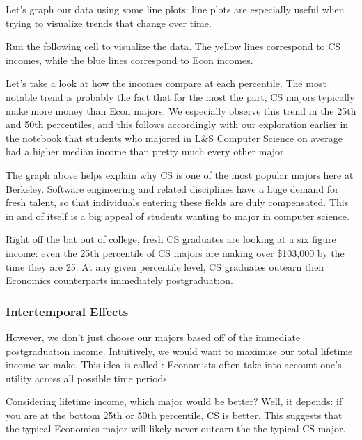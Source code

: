 \documentclass[letterpaper,10pt,english]{jupyterBook}
\begin{document}
\sphinxAtStartPar
Let’s graph our data using some line plots: line plots are especially useful when trying to visualize trends that change over time.

\sphinxAtStartPar
Run the following cell to visualize the data. The yellow lines correspond to CS incomes, while the blue lines correspond to Econ incomes.

\noindent{}

\sphinxAtStartPar
Let’s take a look at how the incomes compare at each percentile. The most notable trend is probably the fact that for the most the part, CS majors typically make more money than Econ majors.
We especially observe this trend in the 25th and 50th percentiles, and this follows accordingly with our exploration earlier in the notebook that students who majored in L\&S Computer Science on average had a higher median income than pretty much every other major.

\sphinxAtStartPar
The graph above helps explain why CS is one of the most popular majors here at Berkeley.
Software engineering and related disciplines have a huge demand for fresh talent, so that individuals entering these fields are duly compensated. This in and of itself is a big appeal of students wanting to major in computer science.

\sphinxAtStartPar
Right off the bat out of college, fresh CS graduates are looking at a six figure income: even the 25th percentile of CS majors are making over \$103,000 by the time they are 25. At any given percentile level, CS graduates outearn their Economics counterparts immediately post\sphinxhyphen{}graduation.


\subsubsection{Intertemporal Effects}
\label{\detokenize{content/00-intro/index:intertemporal-effects}}
\sphinxAtStartPar
However, we don’t just choose our majors based off of the immediate post\sphinxhyphen{}graduation income. Intuitively, we would want to maximize our total lifetime income we make. This idea is called : Economists often take into account one’s utility across all possible time periods.

\sphinxAtStartPar
Considering lifetime income, which major would be better? Well, it depends: if you are at the bottom 25th or 50th percentile, CS is better. This suggests that the typical Economics major will likely never outearn the the typical CS major.
\end{document}
